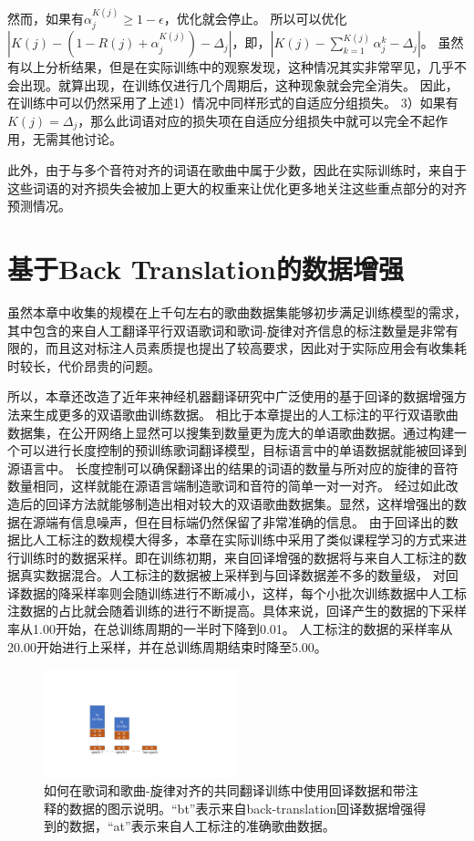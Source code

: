 然而，如果有$\alpha_j^{K(j)} \geq 1 - \epsilon$，优化就会停止。
所以可以优化$\left| K(j) - \left(1 - R(j) + \alpha_j^{K(j)}\right) - \Delta_j \right|$，即，$\left| K(j) -\sum_{k=1}^{K(j)} \alpha_j^{k} - \Delta_j \right|$。
虽然有以上分析结果，但是在实际训练中的观察发现，这种情况其实非常罕见，几乎不会出现。就算出现，在训练仅进行几个周期后，这种现象就会完全消失。
因此，在训练中可以仍然采用了上述1）情况中同样形式的自适应分组损失。
3）如果有$K(j) = \Delta_j$，那么此词语对应的损失项在自适应分组损失中就可以完全不起作用，无需其他讨论。

此外，由于与多个音符对齐的词语在歌曲中属于少数，因此在实际训练时，来自于这些词语的对齐损失会被加上更大的权重来让优化更多地关注这些重点部分的对齐预测情况。
\section{基于Back Translation的数据增强}
\label{sec:bta}
虽然本章中收集的规模在上千句左右的歌曲数据集能够初步满足训练模型的需求，其中包含的来自人工翻译平行双语歌词和歌词-旋律对齐信息的标注数量是非常有限的，而且这对标注人员素质提也提出了较高要求，因此对于实际应用会有收集耗时较长，代价昂贵的问题。

所以，本章还改造了近年来神经机器翻译研究中广泛使用的基于回译的数据增强方法\citep{backtrans}来生成更多的双语歌曲训练数据。
相比于本章提出的人工标注的平行双语歌曲数据集，在公开网络上显然可以搜集到数量更为庞大的单语歌曲数据。通过构建一个可以进行长度控制的预训练歌词翻译模型，目标语言中的单语数据就能被回译到源语言中。
长度控制可以确保翻译出的结果的词语的数量与所对应的旋律的音符数量相同，这样就能在源语言端制造歌词和音符的简单一对一对齐。
经过如此改造后的回译方法就能够制造出相对较大的双语歌曲数据集。显然，这样增强出的数据在源端有信息噪声，但在目标端仍然保留了非常准确的信息。
由于回译出的数据比人工标注的数规模大得多，本章在实际训练中采用了类似课程学习的方式来进行训练时的数据采样。即在训练初期，来自回译增强的数据将与来自人工标注的数据真实数据混合。人工标注的数据被上采样到与回译数据差不多的数量级，
对回译数据的降采样率则会随训练进行不断减小，这样，每个小批次训练数据中人工标注数据的占比就会随着训练的进行不断提高。具体来说，回译产生的数据的下采样率从1.00开始，在总训练周期的一半时下降到0.01。
人工标注的数据的采样率从20.00开始进行上采样，并在总训练周期结束时降至5.00。

\begin{figure}[htbp]
    \centering
    \includegraphics[width=0.5\textwidth]{figure/ast/backtrans_curriculum.pdf}
    \caption{如何在歌词和歌曲-旋律对齐的共同翻译训练中使用回译数据和带注释的数据的图示说明。``bt''表示来自back-translation回译数据增强得到的数据，``at''表示来自人工标注的准确歌曲数据。}
    \label{fig:bt_curriculum}
\end{figure}
